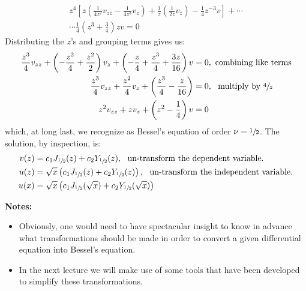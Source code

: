\begin{multline*}
z^4\left[ z\left(\frac{1}{4z^2}v_{zz}-\frac{1}{4z^3}v_z\right) + \frac{1}{z}\left(\frac{1}{2z}v_z \right)-\frac{1}{4}z^{-3}v\right]+ \cdots \\
\cdots \frac{1}{4}\left(z^3+\frac{3}{4}\right)zv = 0 
\end{multline*}
Distributing the $z$'s and grouping terms gives us:
\begin{align*}
\frac{z^3}{4}v_{zz}+\left(-\frac{z^2}{4}+\frac{z^2}{2} \right)v_z + \left(-\frac{z}{4}+\frac{z^3}{4}+\frac{3z}{16}\right)v &= 0, \text{ combining like terms}\\
\frac{z^3}{4}v_{zz}+\frac{z^2}{4}v_z + \left(\frac{z^3}{4}-\frac{z}{16} \right) &= 0, \ \text{ multiply by }\sfrac{4}{z} \\
z^2v_{zz}+zv_z+\left(z^2-\frac{1}{4}\right)v &= 0
\end{align*}
which, at long last, we recognize as Bessel's equation of order $\nu = \sfrac{1}{2}$.  The solution, by inspection, is:
\begin{align*}
v(z) &= c_1J_{\sfrac{1}{2}}(z) + c_2 Y_{\sfrac{1}{2}}(z), \ \ \text{un-transform the dependent variable.} \\
u(z) &= \sqrt{x}\left(c_1J_{\sfrac{1}{2}}(z) + c_2 Y_{\sfrac{1}{2}}(z) \right), \ \ \text{un-transform the independent variable.} \\
u(x) &= \sqrt{x}\left(c_1J_{\sfrac{1}{2}}(\sqrt{x}) + c_2Y_{\sfrac{1}{2}}(\sqrt{x})\right)
\end{align*}

\vspace{1.0cm}

\noindent\textbf{Notes:}
\begin{itemize}
\item Obviously, one would need to have spectacular insight to know in advance what transformations should be made in order to convert a given differential equation into Bessel's equation.  
\item In the next lecture we will make use of some tools that have been developed to simplify these transformations.
\end{itemize}

